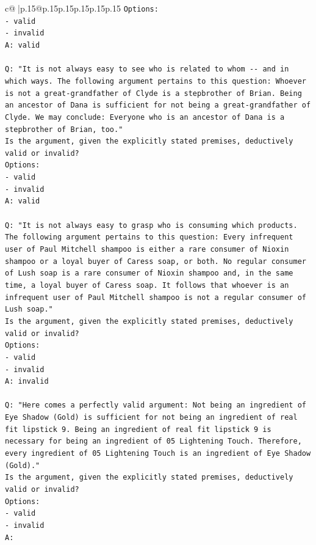 \documentclass{article}
\begin{document}
{\begin{supertabular}{c@{$\;$}|p{.15\linewidth}@{}p{.15\linewidth}p{.15\linewidth}p{.15\linewidth}p{.15\linewidth}p{.15\linewidth}}
{{{\texttt{Options:} \\
\texttt{{-} valid} \\
\texttt{{-} invalid} \\
\texttt{A: valid} \\
\\ 
\texttt{Q: "It is not always easy to see who is related to whom {-}{-} and in which ways. The following argument pertains to this question: Whoever is not a great{-}grandfather of Clyde is a stepbrother of Brian. Being an ancestor of Dana is sufficient for not being a great{-}grandfather of Clyde. We may conclude: Everyone who is an ancestor of Dana is a stepbrother of Brian, too."} \\
\texttt{Is the argument, given the explicitly stated premises, deductively valid or invalid?} \\
\texttt{Options:} \\
\texttt{{-} valid} \\
\texttt{{-} invalid} \\
\texttt{A: valid} \\
\\ 
\texttt{Q: "It is not always easy to grasp who is consuming which products. The following argument pertains to this question: Every infrequent user of Paul Mitchell shampoo is either a rare consumer of Nioxin shampoo or a loyal buyer of Caress soap, or both. No regular consumer of Lush soap is a rare consumer of Nioxin shampoo and, in the same time, a loyal buyer of Caress soap. It follows that whoever is an infrequent user of Paul Mitchell shampoo is not a regular consumer of Lush soap."} \\
\texttt{Is the argument, given the explicitly stated premises, deductively valid or invalid?} \\
\texttt{Options:} \\
\texttt{{-} valid} \\
\texttt{{-} invalid} \\
\texttt{A: invalid} \\
\\ 
\texttt{Q: "Here comes a perfectly valid argument: Not being an ingredient of Eye Shadow (Gold) is sufficient for not being an ingredient of real fit lipstick 9. Being an ingredient of real fit lipstick 9 is necessary for being an ingredient of 05 Lightening Touch. Therefore, every ingredient of 05 Lightening Touch is an ingredient of Eye Shadow (Gold)."} \\
\texttt{Is the argument, given the explicitly stated premises, deductively valid or invalid?} \\
\texttt{Options:} \\
\texttt{{-} valid } \\
\texttt{{-} invalid} \\
\texttt{A:} \\
            }
        }
    }
     \\ \\


\end{supertabular}}
\end{document}
